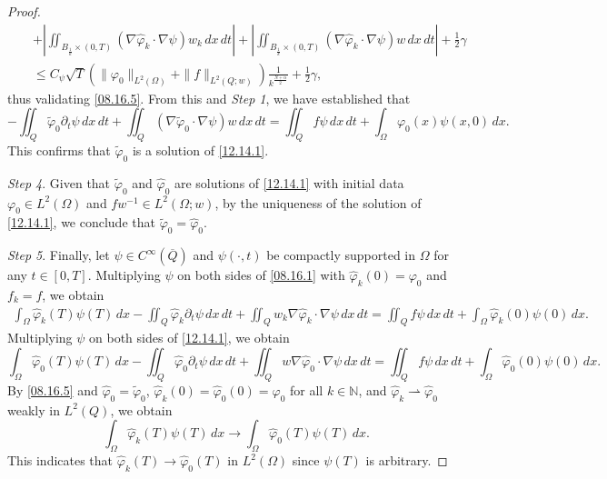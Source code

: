 \documentclass[10pt,a4paper]{amsart}
\begin{document}
\begin{proof}
\begin{eqnarray*}
&&  + \left|\iint_{B_{\frac{1}{k}} \times (0,T)} (\nabla\widehat{\varphi}_k \cdot \nabla\psi) w_k \, dx \, dt\right| + \left|\iint_{B_{\frac{1}{k}} \times (0,T)} (\nabla\widehat{\varphi}_k \cdot \nabla\psi) w \, dx \, dt\right| + \frac{1}{2}\gamma \\
&&\leq C_\psi \sqrt{T} \left(\|\varphi_0\|_{L^2(\Omega)} + \|f\|_{L^2(Q; w)}\right) \frac{1}{k^{\frac{N+\alpha}{2}}} + \frac{1}{2}\gamma,
\end{eqnarray*}
thus validating \eqref{08.16.5}. From this and {\it Step 1}, we have established that
\begin{equation*}
-\iint_Q \widetilde{\varphi}_0 \partial_t \psi \, dx \, dt + \iint_Q (\nabla\widetilde{\varphi}_0 \cdot \nabla\psi) w \, dx \, dt = \iint_Q f \psi \, dx \, dt + \int_\Omega \varphi_0(x) \psi(x,0) \, dx.
\end{equation*}
This confirms that $\widetilde{\varphi}_0$ is a solution of \eqref{12.14.1}.

{\it Step 4}. Given that $\widetilde{\varphi}_0$ and $\widehat{\varphi}_0$ are solutions of \eqref{12.14.1} with initial data $\varphi_0 \in L^2(\Omega)$ and $f w^{-1} \in L^2(\Omega; w)$, by the uniqueness of the solution of \eqref{12.14.1}, we conclude that $\widetilde{\varphi}_0 = \widehat{\varphi}_0$.

{\it Step 5}. Finally, let $\psi \in C^\infty(\overline{Q})$ and $\psi(\cdot, t)$ be compactly supported in $\Omega$ for any $t \in [0,T]$. Multiplying $\psi$ on both sides of \eqref{08.16.1} with $\widehat{\varphi}_k(0) = \varphi_0$ and $f_k = f$, we obtain
\begin{equation*}
\begin{split}
\int_\Omega \widehat{\varphi}_k(T) \psi(T) \, dx - \iint_Q \widehat{\varphi}_k \partial_t \psi \, dx \, dt + \iint_Q w_k \nabla \widehat{\varphi}_k \cdot \nabla\psi \, dx \, dt = \iint_Q f \psi \, dx \, dt + \int_\Omega \widehat{\varphi}_k(0) \psi(0) \, dx.
\end{split}
\end{equation*}
Multiplying $\psi$ on both sides of \eqref{12.14.1}, we obtain
\begin{equation*}
\int_\Omega \widehat{\varphi}_0(T) \psi(T) \, dx - \iint_Q \widehat{\varphi}_0 \partial_t \psi \, dx \, dt + \iint_Q w \nabla \widehat{\varphi}_0 \cdot \nabla\psi \, dx \, dt = \iint_Q f \psi \, dx \, dt + \int_\Omega \widehat{\varphi}_0(0) \psi(0) \, dx.
\end{equation*}
By \eqref{08.16.5} and $\widehat{\varphi}_0 = \widetilde{\varphi}_0$, $\widehat{\varphi}_k(0) = \widehat{\varphi}_0(0) = \varphi_0$ for all $k \in \mathbb{N}$, and $\widehat{\varphi}_k \rightharpoonup \widehat{\varphi}_0$ weakly in $L^2(Q)$, we obtain
\begin{equation*}
\int_\Omega \widehat{\varphi}_k(T) \psi(T) \, dx \to \int_\Omega \widehat{\varphi}_0(T) \psi(T) \, dx.
\end{equation*}
This indicates that $\widehat{\varphi}_k(T) \to \widehat{\varphi}_0(T)$ in $L^2(\Omega)$ since $\psi(T)$ is arbitrary.
\end{proof}
\end{document}
